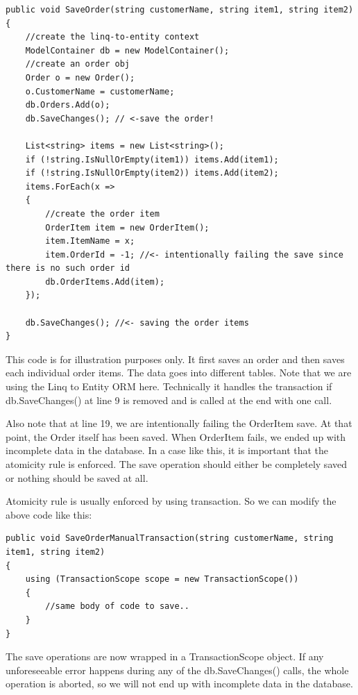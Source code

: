 \begin{lstlisting}[caption={SaveOrder Example}, label=transactionex, frame=tb, basicstyle=\scriptsize]
public void SaveOrder(string customerName, string item1, string item2)
{
	//create the linq-to-entity context
	ModelContainer db = new ModelContainer();
	//create an order obj
	Order o = new Order();
	o.CustomerName = customerName;
	db.Orders.Add(o);
	db.SaveChanges(); // <-save the order!

	List<string> items = new List<string>();
	if (!string.IsNullOrEmpty(item1)) items.Add(item1);
	if (!string.IsNullOrEmpty(item2)) items.Add(item2);
	items.ForEach(x =>
	{
		//create the order item
		OrderItem item = new OrderItem();
		item.ItemName = x;
		item.OrderId = -1; //<- intentionally failing the save since there is no such order id
		db.OrderItems.Add(item);
	});

	db.SaveChanges(); //<- saving the order items
}
\end{lstlisting}

This code is for illustration purposes only. It first saves an order and then saves each individual order items. The data goes into different tables. Note that we are using the Linq to Entity ORM here. Technically it handles the transaction if db.SaveChanges() at line 9 is removed and is called at the end with one call.

Also note that at line 19, we are intentionally failing the OrderItem save. At that point, the Order itself has been saved. When OrderItem fails, we ended up with incomplete data in the database. In a case like this, it is important that the atomicity rule is enforced. The save operation should either be completely saved or nothing should be saved at all. 

Atomicity rule is usually enforced by using transaction. So we can modify the above code like this:

\begin{lstlisting}[caption={SaveOrderManualTransaction Example}, label=manualtrans, frame=tb, basicstyle=\scriptsize]
public void SaveOrderManualTransaction(string customerName, string item1, string item2)
{
	using (TransactionScope scope = new TransactionScope())
	{
		//same body of code to save..
	}
}
\end{lstlisting}

The save operations are now wrapped in a TransactionScope object. If any unforeseeable error happens during any of the db.SaveChanges() calls, the whole operation is aborted, so we will not end up with incomplete data in the database.

